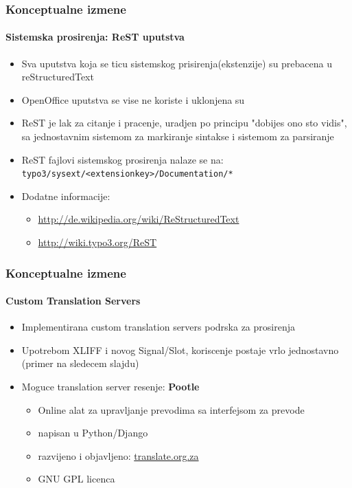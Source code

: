 \begin{frame}[fragile]
	\frametitle{Konceptualne izmene}
	\framesubtitle{Sistemska prosirenja: ReST uputstva}

	\begin{itemize}
		\item Sva uputstva koja se ticu sistemskog prisirenja(ekstenzije) su prebacena u reStructuredText
		\item OpenOffice uputstva se vise ne koriste i uklonjena su
		\item ReST je lak za citanje i pracenje, uradjen po principu "dobijes ono sto vidis", sa jednostavnim sistemom za markiranje sintakse i sistemom za parsiranje
		\item ReST fajlovi sistemskog prosirenja nalaze se na:\newline
			\texttt{typo3/sysext/<extensionkey>/Documentation/*}

		\item Dodatne informacije:

			\begin{itemize}
				\item \url{http://de.wikipedia.org/wiki/ReStructuredText}
				\item \url{http://wiki.typo3.org/ReST}
			\end{itemize}

	\end{itemize}

\end{frame}


\begin{frame}[fragile]
	\frametitle{Konceptualne izmene}
	\framesubtitle{Custom Translation Servers}

	\begin{itemize}
		\item Implementirana custom translation servers podrska za prosirenja
		\item Upotrebom XLIFF i novog Signal/Slot,\newline
			 koriscenje postaje vrlo jednostavno (primer na sledecem slajdu)
		\item Moguce translation server resenje: \textbf{Pootle}

			\begin{itemize}
				\item Online alat za upravljanje prevodima sa interfejsom za prevode
				\item napisan u Python/Django
				\item razvijeno i objavljeno: \url{translate.org.za}
				\item GNU GPL licenca
			\end{itemize}

	\end{itemize}

\end{frame}

